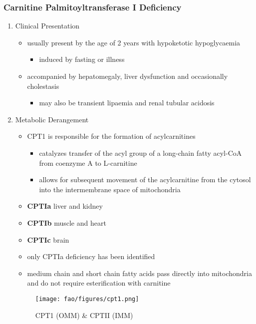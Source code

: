 \documentclass{scrartcl}
\begin{document}
\subsubsection{Carnitine Palmitoyltransferase I Deficiency}
\label{sec:org8790e4a}
\begin{enumerate}
\item Clinical Presentation
\label{sec:org651b346}
\begin{itemize}
\item usually present by the age of 2 years with hypoketotic hypoglycaemia
\begin{itemize}
\item induced by fasting or illness
\end{itemize}
\item accompanied by hepatomegaly, liver dysfunction and occasionally cholestasis
\begin{itemize}
\item may also be transient lipaemia and renal tubular acidosis
\end{itemize}
\end{itemize}
\item Metabolic Derangement
\label{sec:org3874a5d}
\begin{itemize}
\item CPT1 is responsible for the formation of acylcarnitines
\begin{itemize}
\item catalyzes transfer of the acyl group of a long-chain fatty
acyl-CoA from coenzyme A to L-carnitine
\item allows for subsequent movement of the acylcarnitine from the
cytosol into the intermembrane space of mitochondria
\end{itemize}
\item \textbf{CPTIa} liver and kidney
\item \textbf{CPTIb}  muscle and heart
\item \textbf{CPTIc}  brain
\item only CPTIa deficiency has been identified
\item medium chain and short chain fatty acids pass directly into
mitochondria and do not require esterification with carnitine
\end{itemize}

\begin{figure}[htbp]
\centering
\texttt{[image: fao/figures/cpt1.png]}
\caption{\label{fig:org9ae1604}CPT1 (OMM) \& CPTII (IMM)}
\end{figure}


\end{enumerate}
\end{document}

